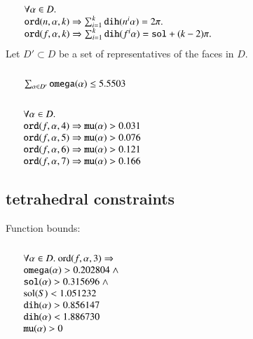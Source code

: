$$
\begin{array}{lll}
\leftalign\\
\forall \alpha\in D.\\ 
   \optt{ord}(n,\alpha,k) \Rightarrow
   \sum_{i=1}^k \optt{dih}(n^i\alpha )  = 2\pi.\\
   \optt{ord}(f,\alpha,k) \Rightarrow
   \sum_{i=1}^k \optt{dih}(f^i\alpha ) = \optt{sol} + (k -2)\pi.\\
   \end{array}
$$
\noindent
Let $D'\subset D$ be a set of representatives of the faces in $D$.
$$
\begin{array}{lll}
\leftalign\\
\sum_{\alpha\in D'} \optt{omega}(\alpha) \le 5.5503 \\
\end{array}
$$
$$
\begin{array}{lll}
\leftalign\\
\forall \alpha\in D.\\
   \optt{ord}(f,\alpha,4) \Rightarrow
   \optt{mu}(\alpha) > 0.031 \\
   \optt{ord}(f,\alpha,5) \Rightarrow
   \optt{mu}(\alpha) > 0.076 \\
   \optt{ord}(f,\alpha,6) \Rightarrow
   \optt{mu}(\alpha) > 0.121 \\
   \optt{ord}(f,\alpha,7) \Rightarrow
   \optt{mu}(\alpha) > 0.166 \\
\end{array}
$$




\subsection{tetrahedral constraints}

\noindent
Function bounds:
$$
\begin{array}{lll}
\leftalign\\
  \forall \alpha\in D. \ \op{ord}(f,\alpha,3) 
   \Rightarrow \\ 
      \optt{omega}(\alpha) > 0.202804  \sland \\
   \optt{sol}(\alpha) > 0.315696 \sland \\
   \sol(S) < 1.051232\\
   \optt{dih}(\alpha) > 0.856147\\
   \optt{dih}(\alpha) < 1.886730\\
   \optt{mu}(\alpha) > 0
\end{array}
$$

